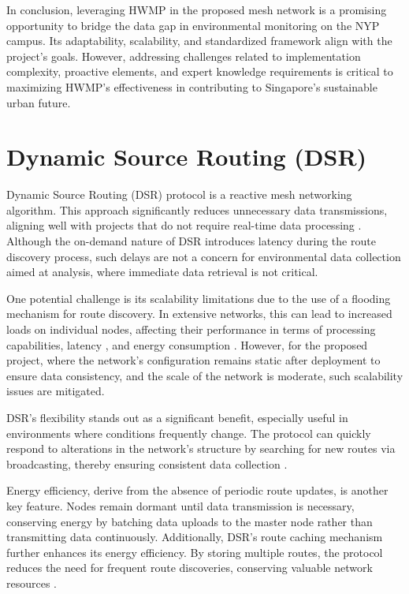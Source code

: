 In conclusion, leveraging HWMP in the proposed mesh network is a promising opportunity to bridge the data gap in environmental monitoring on the NYP campus. Its adaptability, scalability, and standardized framework align with the project's goals. However, addressing challenges related to implementation complexity, proactive elements, and expert knowledge requirements is critical to maximizing HWMP's effectiveness in contributing to Singapore's sustainable urban future.

\section*{Dynamic Source Routing (DSR)}\label{sec:lit_review}
Dynamic Source Routing (DSR) protocol is a reactive mesh networking algorithm. This approach significantly reduces unnecessary data transmissions, aligning well with projects that do not require real-time data processing \cite{5431521}. Although the on-demand nature of DSR introduces latency during the route discovery process, such delays are not a concern for environmental data collection aimed at analysis, where immediate data retrieval is not critical.

One potential challenge is its scalability limitations due to the use of a flooding mechanism for route discovery. In extensive networks, this can lead to increased loads on individual nodes, affecting their performance in terms of processing capabilities, latency \cite{6488843}, and energy consumption \cite{energy,1431308}. However, for the proposed project, where the network's configuration remains static after deployment to ensure data consistency, and the scale of the network is moderate, such scalability issues are mitigated.

DSR's flexibility stands out as a significant benefit, especially useful in environments where conditions frequently change. The protocol can quickly respond to alterations in the network's structure by searching for new routes via broadcasting, thereby ensuring consistent data collection \cite{5497794}. 

Energy efficiency, derive from the absence of periodic route updates, is another key feature. Nodes remain dormant until data transmission is necessary, conserving energy by batching data uploads to the master node rather than transmitting data continuously. Additionally, DSR's route caching mechanism further enhances its energy efficiency. By storing multiple routes, the protocol reduces the need for frequent route discoveries, conserving valuable network resources \cite{1431308}.

